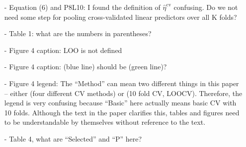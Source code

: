 \documentclass{article}
\newcommand{\re}{\textbf{Response: }}
\newcommand\bd[1]{{\color{blue}#1}}
\newcommand{\boldeta}{\boldsymbol\eta}
\begin{document}
\begin{enumerate}[align = left]
\begin{itemize}[align = left]
\item[-]  Equation (6) and P8L10: I found the definition of $\hat{\eta}^{\text{cv}}$ confusing. Do we not need some step for pooling cross-validated linear predictors over all K folds?

 
\item[-]  Table 1: what are the numbers in parentheses? 


\item[-] Figure 4 caption: LOO is not defined


\item[-]  Figure 4 caption: (blue line) should be (green line)?


\item[-]  Figure 4 legend: The “Method” can mean two different things in this paper – either (four different CV methods) or (10 fold CV, LOOCV). Therefore, the legend is very confusing because “Basic” here actually means basic CV with 10 folds. Although the text in the paper clarifies this, tables and figures need to be understandable by themselves without reference to the text.


\item[-]  Table 4, what are “Selected” and “P” here?


\end{itemize}
\end{enumerate}
\end{document}
